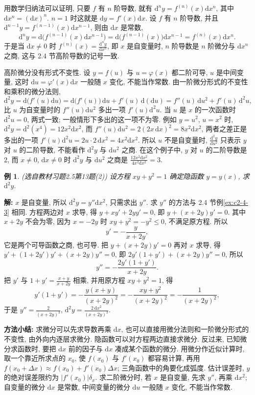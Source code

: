\documentclass[UTF8,openany]{ctexbook}
\theoremstyle{chinesetextbook}
\newtheorem{example}{例}[section]
\newenvironment{cnsolution}{\par\indent\textbf{解:} \ignorespaces}{\par}
\newcommand{\dd}{\mathrm d}
\begin{document}
用数学归纳法可以证明, 只要 $f$ 有 $n$ 阶导数, 就有 $\dd^ny=f^{(n)}(x)\dd x^n$, 其中 $\dd x^n=(\dd x)^n$. $n=1$ 时这就是 $\dd y=f'(x)\dd x$. 设 $f$ 有 $n$ 阶导数, 并且 $\dd^{n-1}y=f^{(n-1)}(x)\dd x^{n-1}$, 则由 $\dd x$ 是常数,
\[
\dd^ny=\dd\bigl(f^{(n-1)}(x)\dd x^{n-1}\bigr)=\dd\bigl(f^{(n-1)}(x)\bigr)\dd x^{n-1}=f^{(n)}(x)\dd x^n.
\]
于是当 $\dd x\ne0$ 时 $\displaystyle f^{(n)}(x)=\frac{\dd^ny}{\dd x^n}$, 即 $x$ 是自变量时, $n$ 阶导数是 $n$ 阶微分与 $\dd x^n$ 之商, 这与 2.4 节高阶导数的记号一致.

高阶微分没有形式不变性. 设 $y=f(u)$ 与 $u=\varphi(x)$ 都二阶可导, $u$ 是中间变量, 这时 $\dd u=\varphi'(x)\dd x$ 一般随 $x$ 变化, 不能当作常数. 由一阶微分形式的不变性和乘积的微分法则,
\[
\dd^2y=\dd\bigl(f'(u)\dd u\bigr)=\dd\bigl(f'(u)\bigr)\,\dd u+f'(u)\,\dd(\dd u)=f''(u)\,\dd u^2+f'(u)\,\dd^2u,
\]
比 $u$ 为自变量时的 $f''(u)\dd u^2$ 多出一项 $f'(u)\dd^2u$. 当 $u$ 是 $x$ 的一次函数时 $\dd^2u=0$, 两式一致; 一般情形下多出的这一项不为零. 例如 $y=u^2$, $u=x^2$ 时, $\dd^2y=\dd^2(x^4)=12x^2\dd x^2$, 而 $f''(u)\dd u^2=2(2x\,\dd x)^2=8x^2\dd x^2$, 两者之差正是多出的一项 $f'(u)\dd^2u=2u\cdot2\,\dd x^2=4x^2\dd x^2$. 所以 $u$ 不是自变量时, $\displaystyle\frac{\dd^2y}{\dd u^2}$ 只表示 $y$ 对 $u$ 的二阶导数, 不能看作 $\dd^2y$ 与 $\dd u^2$ 之商. 在这个例子中, $y$ 对 $u$ 的二阶导数是 $2$, 而 $x\ne0$, $\dd x\ne0$ 时 $\dd^2y$ 与 $\dd u^2$ 之商是 $\displaystyle\frac{12x^2\dd x^2}{4x^2\dd x^2}=3$.
\begin{example}\label{ex:c2-h5-13}
\textnormal{(选自教材习题2.5第13题(2))} 设方程 $xy+y^2=1$ 确定隐函数 $y=y(x)$, 求 $\dd^2y$.
\end{example}
\begin{cnsolution}
$x$ 是自变量, 所以 $\dd^2y=y''\dd x^2$, 只需求出 $y''$. 求 $y''$ 的方法与 2.4 节例\ref{ex:c2-4-3} 相同. 方程两边对 $x$ 求导, 得 $y+xy'+2yy'=0$, 即 $y+(x+2y)y'=0$. 其中 $x+2y$ 不会为零, 因为 $x=-2y$ 时 $xy+y^2=-y^2\le0$, 不满足原方程. 所以
\[
y'=-\frac y{x+2y},
\]
它是两个可导函数之商, 也可导. 把 $y+(x+2y)y'=0$ 再对 $x$ 求导, 得 $y'+(1+2y')y'+(x+2y)y''=0$, 即 $2y'(1+y')+(x+2y)y''=0$, 所以
\[
y''=-\frac{2y'(1+y')}{x+2y}.
\]
把 $y'$ 与 $\displaystyle1+y'=\frac{x+y}{x+2y}$ 相乘, 并用原方程 $xy+y^2=1$, 得
\[
y'(1+y')=-\frac{y(x+y)}{(x+2y)^2}=-\frac{xy+y^2}{(x+2y)^2}=-\frac1{(x+2y)^2},
\]
于是 $\displaystyle y''=\frac2{(x+2y)^3}$, $\displaystyle\dd^2y=\frac{2\,\dd x^2}{(x+2y)^3}$.
\end{cnsolution}
\par\indent\textbf{方法小结:} 求微分可以先求导数再乘 $\dd x$, 也可以直接用微分法则和一阶微分形式的不变性, 由外向内逐层求微分. 隐函数可以对方程两边直接求微分. 反过来, 已知微分求函数时, 要把 $\dd x$ 前的因子与 $\dd x$ 凑成某个函数的微分. 用微分作近似计算时, 取一个靠近所求点的 $x_0$, 使 $f(x_0)$ 与 $f'(x_0)$ 都容易计算, 再用 $f(x_0+\Delta x)\approx f(x_0)+f'(x_0)\Delta x$; 三角函数中的角要化成弧度. 估计误差时, $y$ 的绝对误差限约为 $|f'(x_0)|\delta_x$. 求二阶微分时, 若 $x$ 是自变量, 先求 $y''$, 再乘 $\dd x^2$; 自变量的微分 $\dd x$ 是常数, 中间变量的微分 $\dd u$ 一般随 $x$ 变化, 不能当作常数.
\end{document}
